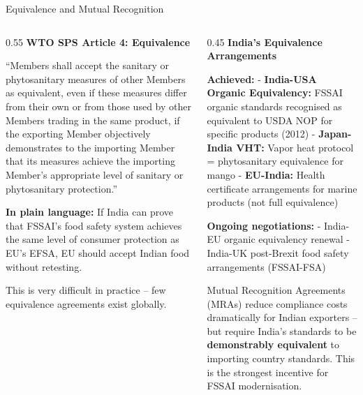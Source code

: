 \documentclass[
  ignorenonframetext,
  aspectratio=169,
]{beamer}
\makeatletter
\let\quarto@originallabel\label
\DeclareRobustCommand*{\label}[1]{\quarto@originallabel{#1}}
\makeatother
\begin{document}
\begin{frame}{Equivalence and Mutual Recognition}
\label{equivalence-and-mutual-recognition}
\begin{columns}[T]
\begin{column}{0.55\linewidth}
\textbf{WTO SPS Article 4: Equivalence}

``Members shall accept the sanitary or phytosanitary measures of other
Members as equivalent, even if these measures differ from their own or
from those used by other Members trading in the same product, if the
exporting Member objectively demonstrates to the importing Member that
its measures achieve the importing Member's appropriate level of
sanitary or phytosanitary protection.''

\textbf{In plain language:} If India can prove that FSSAI's food safety
system achieves the same level of consumer protection as EU's EFSA, EU
should accept Indian food without retesting.

This is very difficult in practice -- few equivalence agreements exist
globally.
\end{column}

\begin{column}{0.45\linewidth}
\textbf{India's Equivalence Arrangements}

\textbf{Achieved:} - \textbf{India-USA Organic Equivalency:} FSSAI
organic standards recognised as equivalent to USDA NOP for specific
products (2012) - \textbf{Japan-India VHT:} Vapor heat protocol =
phytosanitary equivalence for mango - \textbf{EU-India:} Health
certificate arrangements for marine products (not full equivalence)

\textbf{Ongoing negotiations:} - India-EU organic equivalency renewal -
India-UK post-Brexit food safety arrangements (FSSAI-FSA)

Mutual Recognition Agreements (MRAs) reduce compliance costs
dramatically for Indian exporters -- but require India's standards to be
\textbf{demonstrably equivalent} to importing country standards. This is
the strongest incentive for FSSAI modernisation.
\end{column}
\end{columns}
\end{frame}
\end{document}
